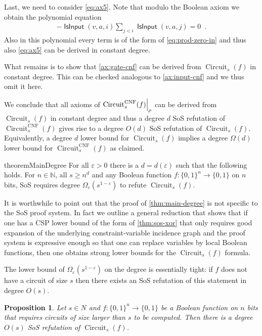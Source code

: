 \documentclass[10pt,a4paper]{article}
\theoremstyle{plain}
\newtheorem{proposition}[theorem]{Proposition}
\theoremstyle{remark}
\theoremstyle{definition}
\newcommand{\eps}{\varepsilon}
\newcommand{\eqperiod}{\enspace .}
\newcommand{\set}[1]{\{#1\}}
\newcommand\restrict[2]{{%
  \left.\kern-\nulldelimiterspace %
  #1 %
  \vphantom{\big|} %
  \right|_{#2} %
  }}
\newcommand{\N}{\mathbb{N}}
\newcommand{\vars}[1]{\mathsf{#1}}
\DeclareMathOperator{\circuit}{Circuit}
\DeclareMathOperator{\isvar}{\vars{IsInput}}
\begin{document}
Last, we need to consider \cref{eq:ax5}. Note that modulo the Boolean
axiom we obtain the polynomial equation
\begin{align}
  - \isvar(v,a,i)\sum_{j < i}\isvar(v,a,j) = 0 \eqperiod
\end{align}
Also in this polynomial every term is of the form of
\cref{eq:prod-zero-in} and thus also \cref{eq:ax5} can be derived in
constant degree.

What remains is to show that \cref{ax:gate-cnf} can be derived from
$\circuit_s(f)$ in constant degree. This can be checked analogous to
\cref{ax:input-cnf} and we thus omit it here.

We conclude that all axioms of $\restrict{\circuit^{\mathrm{CNF}}_s(f)}{\rho}$ can
be derived from $\circuit_s(f)$ in constant degree and thus a degree
$d$ SoS refutation of $\circuit_s^{\mathrm{CNF}}(f)$ gives rise to a degree
$O(d)$ SoS refutation of $\circuit_s(f)$. Equivalently, a degree $d$
lower bound for $\circuit_s(f)$ implies a degree $\Omega(d)$ lower
bound for $\circuit_s^{\mathrm{CNF}}(f)$ as claimed.

\begin{restatable}{theorem}{MainDegree}
  \label{thm:main-degree}
  For all $\eps > 0$ there is a $d = d(\eps)$ such that the following
  holds.  For $n \in \N$, all $s \ge n^{d}$ and any Boolean function
  $f:\set{0,1}^{n} \rightarrow \set{0,1}$ on $n$ bits, SoS requires
  degree $\Omega_\eps(s^{1-\eps})$ to refute $\circuit_s(f)$.
\end{restatable}

It is worthwhile to point out that the proof of \cref{thm:main-degree}
is not specific to the SoS proof system. In fact we outline a general
reduction that shows that if one has a CSP lower bound of the form of
\cref{thm:sos-xor} that only requires good expansion of the underlying
constraint-variable incidence graph and the proof system is expressive
enough so that one can replace variables by local Boolean functions,
then one obtains strong lower bounds for the $\circuit_s(f)$ formula.

The lower bound of $\Omega_\eps(s^{1-\eps})$ on the degree is
essentially tight: if $f$ does not have a circuit of size $s$ then
there exists an SoS refutation of this statement in degree $O(s)$.

\begin{proposition}
  Let $s \in N$ and $f: \set{0,1}^n \rightarrow \set{0,1}$ be a
  Boolean function on $n$ bits that requires circuits of size larger
  than $s$ to be computed. Then there is a degree $O(s)$ SoS
  refutation of $\circuit_s(f)$.
\end{proposition}
\end{document}
